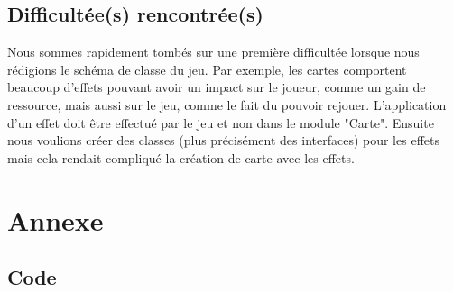 \documentclass[a4paper, 12pt, french]{article}
\begin{document}
	\subsection{Difficultée(s) rencontrée(s)}
	Nous sommes rapidement tombés sur une première difficultée lorsque nous rédigions le schéma de classe du jeu.
	Par exemple, les cartes comportent beaucoup d'effets pouvant avoir un impact sur le joueur,
	comme un gain de ressource, mais aussi sur le jeu, comme le fait du pouvoir rejouer. L'application d'un effet
	doit être effectué par le jeu et non dans le module "Carte". Ensuite nous voulions créer des classes (plus
	précisément des interfaces) pour les effets mais cela rendait compliqué la création de carte avec les effets.

	\section{Annexe}
	\subsection{Code}

	\printbibliography
\end{document}
